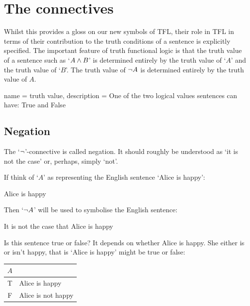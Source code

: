 \chapter{The connectives}\label{sec:Connectives}
Whilst this provides a gloss on our new symbols of TFL, their role in TFL in terms of their contribution to the truth conditions of a sentence is explicitly specified. 
The important feature of truth functional logic is that the truth value of a sentence such as `$A\mathbin{\wedge} B$' is determined entirely by the truth value of `$A$' and the truth value of `$B$'. The truth value of $\neg A$ is determined entirely by the truth value of $A$. 

{
			name = truth value,
			description = {One of the two logical values sentences can have: True and False}
		}


\section{Negation}
The `$\neg$'-connective is called negation. It should roughly be understood as `it is not the case' or, perhaps, simply `not'. 

If think of `$A$' as representing the English sentence `Alice is happy':
\begin{ekey}
	\item[A] Alice is happy
\end{ekey}
Then `$\neg A$' will be used to symbolise the English sentence:
\begin{samplesent}
	\item {It is not the case that} Alice is happy
\end{samplesent}
Is this sentence true or false? It depends on whether Alice is happy. She either is or isn't happy, that is `Alice is happy' might be true or false:
\begin{center}
	\begin{tabular}{cl}
		$A$&\\\hline\Tstrut
		T& Alice is happy\\
		F& Alice is not happy
	\end{tabular}
\end{center}

